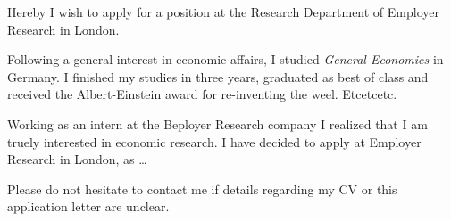 \documentclass[english]{g-brief}
\newcommand{\Sig}[1] %
   { \Gruss{#1}{0.5cm} }
\begin{document}
\Zusatz{}
\Telex{}
\Bank{}
\BLZ{}
\Konto{}
\RetourAdresse{ } %





\Postvermerk{}
\MeinZeichen{}
\IhrZeichen{}
\IhrSchreiben{}
\Verteiler{}


\Datum{\today}

\Sig{Yours sincerely,}

\begin{g-brief}
  
  Hereby I wish to apply for a position at the Research Department of
  Employer Research in London.
  
  Following a general interest in economic affairs, I studied
  \emph{General Economics} in Germany. I finished my studies in three
  years, graduated as best of class and received the Albert-Einstein
  award for re-inventing the weel. Etcetcetc.
  
  Working as an intern at the Beployer Research company I realized
  that I am truely interested in economic research. I have decided to
  apply at Employer Research in London, as \ldots
  
  Please do not hesitate to contact me if details regarding my CV or this
  application letter are unclear.
\end{g-brief}
\end{document}

